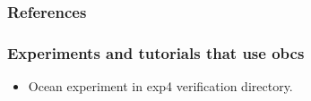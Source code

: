 
\subsubsection{References}

\subsubsection{Experiments and tutorials that use obcs}
\label{sec:pkg:obcs:experiments}

\begin{itemize}
\item{Ocean experiment in exp4 verification directory. }
\end{itemize}


